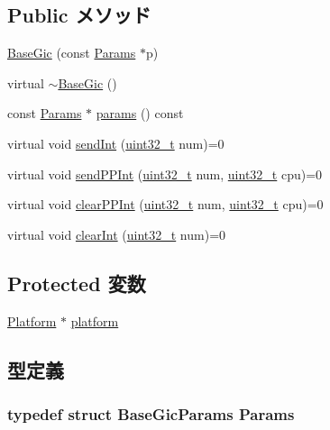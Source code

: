 \subsection*{Public メソッド}
\begin{DoxyCompactItemize}
\item 
\hyperlink{classBaseGic_a99b5d5275b2233fb5e7a41c6f2f73b61}{BaseGic} (const \hyperlink{classBaseGic_aacf2140b95fc8c326a11f01521f5018d}{Params} $\ast$p)
\item 
virtual \hyperlink{classBaseGic_a8dfc74b03784d7a41971842bced51615}{$\sim$BaseGic} ()
\item 
const \hyperlink{classBaseGic_aacf2140b95fc8c326a11f01521f5018d}{Params} $\ast$ \hyperlink{classBaseGic_ad80365b3b51c15f44416b1b835b23570}{params} () const 
\item 
virtual void \hyperlink{classBaseGic_ad6b2cb6b9a108c3852cb5a88126e5320}{sendInt} (\hyperlink{Type_8hh_a435d1572bf3f880d55459d9805097f62}{uint32\_\-t} num)=0
\item 
virtual void \hyperlink{classBaseGic_a89cc9c4f60c3456dca807a71da1e04a8}{sendPPInt} (\hyperlink{Type_8hh_a435d1572bf3f880d55459d9805097f62}{uint32\_\-t} num, \hyperlink{Type_8hh_a435d1572bf3f880d55459d9805097f62}{uint32\_\-t} cpu)=0
\item 
virtual void \hyperlink{classBaseGic_ad6b86158511bccf53411efea34fb8b9a}{clearPPInt} (\hyperlink{Type_8hh_a435d1572bf3f880d55459d9805097f62}{uint32\_\-t} num, \hyperlink{Type_8hh_a435d1572bf3f880d55459d9805097f62}{uint32\_\-t} cpu)=0
\item 
virtual void \hyperlink{classBaseGic_a969450946c91b2daf6aa8ab1a60aa8c2}{clearInt} (\hyperlink{Type_8hh_a435d1572bf3f880d55459d9805097f62}{uint32\_\-t} num)=0
\end{DoxyCompactItemize}
\subsection*{Protected 変数}
\begin{DoxyCompactItemize}
\item 
\hyperlink{classPlatform}{Platform} $\ast$ \hyperlink{classBaseGic_a75b48f1787959a4617f2a599d7c09aab}{platform}
\end{DoxyCompactItemize}


\subsection{型定義}
\hypertarget{classBaseGic_aacf2140b95fc8c326a11f01521f5018d}{
\subsubsection[{Params}]{\setlength{\rightskip}{0pt plus 5cm}typedef struct BaseGicParams {\bf Params}}}
\label{classBaseGic_aacf2140b95fc8c326a11f01521f5018d}


